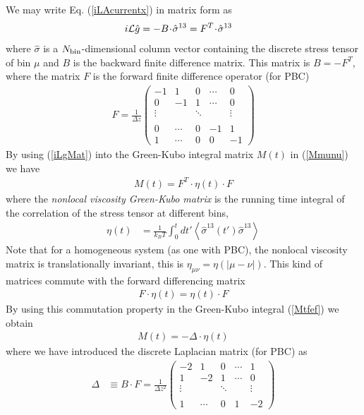 \documentclass[b5paper,openright,11pt]{book}
\newcommand{\esc}{\!\cdot\!}
\newcommand{\llangle}{\left\langle}
\newcommand{\rrangle}{\right\rangle}
\begin{document}
We may write Eq. (\ref{iLAcurrentx}) in matrix form as
\begin{align}
  i{\cal L}\hat{g}&= -B\esc\hat{\sigma}^{13} =F^T\esc\hat{\sigma}^{13}
\label{iLgMat}
\end{align}
where  $\hat{\sigma}$ is  a  $N_{\rm  bin}$-dimensional column  vector
containing the  discrete stress tensor  of bin  $\mu$ and $B$  is the
backward finite difference matrix.  This matrix is $B=-F^T$, where the
matrix $ F$ is the forward finite difference operator (for PBC)
\begin{align}
 {F}=\frac{1}{\Delta z}\left(
    \begin{array}{rrrrr}
-1&1&0&\cdots&0\\
0&-1&1&\cdots&0\\
\vdots      &&\ddots&&\vdots\\
\\
0&\cdots&0&-1&1 
\\
1&\cdots&0&0&-1 \end{array}
\right)
\label{Dforward}
\end{align}
By using (\ref{iLgMat}) into the Green-Kubo integral matrix $M(t)$ in (\ref{Mmunu})
we have
\begin{align}
  M(t)=F^T\esc\eta(t)\esc F
\label{Mtfef}
\end{align}
where  the  \textit{nonlocal  viscosity  Green-Kubo  matrix}  is  the
running  time integral  of the  correlation  of the  stress tensor  at
different bins,
\begin{align}
  \eta(t) &=\frac{1}{k_BT}\int_0^{t}dt' 
  \llangle \hat{\sigma}^{13}(t')\hat{\sigma}^{13}\rrangle
\label{non-loc}
\end{align}
Note that  for a homogeneous system  (as one with PBC),  the nonlocal
viscosity    matrix   is    translationally    invariant,   this    is
$\eta_{\mu\nu}=\eta(|\mu-\nu|)$.  This kind  of matrices  commute with
the forward differencing matrix
\begin{align}
  F\esc\eta(t)=\eta(t)\esc F
\label{commute}
\end{align}
By using this commutation property 
 in the Green-Kubo
integral (\ref{Mtfef}) we obtain
\begin{align}
  M(t)=-\Delta\esc \eta(t)
\label{MmunuMat}
\end{align}
where we have introduced  the discrete Laplacian matrix (for PBC) as
\begin{align}
\Delta&\equiv  B\esc F
=\frac{1}{\Delta z^2}\left(
    \begin{array}{rrrrr}
-2&1&0&\cdots&1\\
1&-2&1&\cdots&0\\
\vdots      &&\ddots&&\vdots\\
\\
1&\cdots&0&1&-2    \end{array}
\right)
\end{align}
\end{document}
